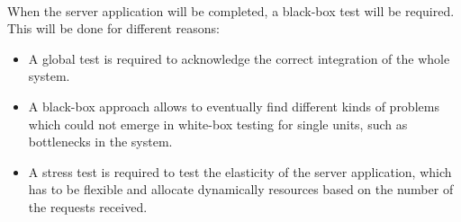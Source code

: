 \paragraph{} When the server application will be completed, a black-box test will be required. This will be done for different reasons:
\begin{itemize}
\item A global test is required to acknowledge the correct integration of the whole system.
\item A black-box approach allows to eventually find different kinds of problems which could not emerge in white-box testing for single units, such as bottlenecks in the system.
\item A stress test is required to test the elasticity of the server application, which has to be flexible and allocate dynamically resources based on the number of the requests received.
\end{itemize}
